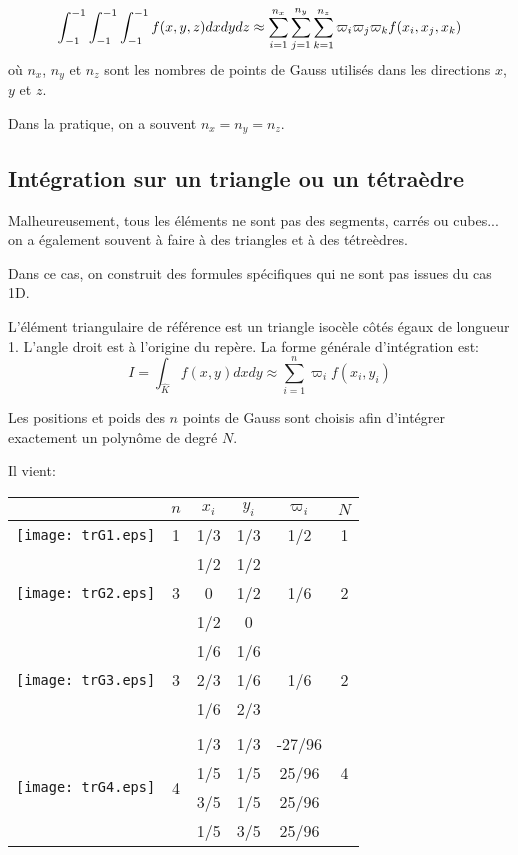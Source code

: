 \begin{equation} \int_{-1}^{-1}\int_{-1}^{-1}\int_{-1}^{-1} f(x,y,z)dxdydz \approx
\displaystyle\sum_{i=1}^{n_x}\displaystyle\sum_{j=1}^{n_y}\displaystyle\sum_{k=1}^{n_z} \varpi_i\varpi_j\varpi_k f(x_i,x_j,x_k)\end{equation}
où $n_x$, $n_y$ et $n_z$ sont les nombres de points de Gauss utilisés dans
les directions $x$, $y$ et $z$.

Dans la pratique, on a souvent $n_x=n_y=n_z$.


\medskip
\subsection*{Intégration sur un triangle ou un tétraèdre}

Malheureusement, tous les éléments ne sont pas des segments, carrés ou cubes...
on a également souvent à faire à des triangles et à des tétreèdres.

Dans ce cas, on construit des formules spécifiques qui ne sont pas issues du cas 1D.

L'élément triangulaire de référence est un triangle isocèle côtés égaux
de longueur 1. L'angle droit est à l'origine du repère. La forme générale d'intégration est:
\begin{equation}
I=\int_{\hat{K}} f(x,y)dxdy \approx \sum_{i=1}^n \varpi_if(x_i,y_i)
\end{equation}

\medskip
Les positions et poids des $n$ points de Gauss 
sont choisis afin d'intégrer exactement un polynôme de degré $N$.

Il vient:
\begin{center}
\begin{tabular}{cccccc}
 & $n$ & $x_i$ & $y_i$ & $\varpi_i$ & $N$\\
\hline
\texttt{[image: trG1.eps]} & 1 & 1/3 & 1/3 & 1/2 & 1\\
\hline
\multirow{3}{*}{\texttt{[image: trG2.eps]}} &
\multirow{3}{*}{3} & 1/2 & 1/2 & \multirow{3}{*}{1/6} & \multirow{3}{*}{2}\\[+2mm]
&&0&1/2&&\\[+2mm]
&&1/2&0&&\\[+2mm]
\hline
\multirow{3}{*}{\texttt{[image: trG3.eps]}} &
\multirow{3}{*}{3} & 1/6 & 1/6 &  \multirow{3}{*}{1/6} & \multirow{3}{*}{2}\\[+2mm]
&&2/3 & 1/6 &&\\[+2mm]
&&1/6&2/3&&\\[+2mm]
\\
\hline
\multirow{4}{*}{\texttt{[image: trG4.eps]}} & 
\multirow{4}{*}{4} & 1/3 & 1/3 & -27/96 & \multirow{3}{*}{4}\\[+2mm]
&&1/5&1/5&25/96&\\[+2mm]
&&3/5&1/5&25/96&\\[+2mm]
&&1/5&3/5&25/96&\\[+2mm]
\end{tabular}
\end{center}

